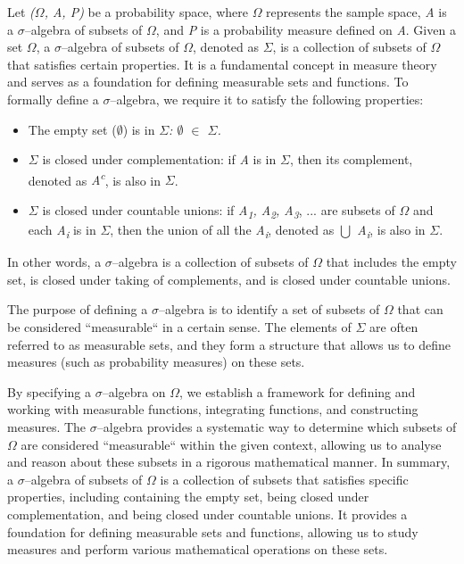 \documentclass[12pt,a4paper]{report}
\numberwithin{equation}{section}
\begin{document}
Let \emph{($\Omega$, A, P)} be a probability space, where \emph{$\Omega$} represents
the sample space, \emph{A} is a $\sigma$--algebra of subsets of \emph{$\Omega$}, and
\emph{P} is a probability measure defined on \emph{A}. Given a set
\emph{$\Omega$}, a $\sigma$--algebra of subsets of \emph{$\Omega$}, denoted as \emph{$\Sigma$}, is a
collection of subsets of \emph{$\Omega$} that satisfies certain properties. It
is a fundamental concept in measure theory and serves as a foundation
for defining measurable sets and functions. To formally define a
$\sigma$--algebra, we require it to satisfy the following properties:

\begin{itemize}
\item
  The empty set ($\emptyset$) is in \emph{$\Sigma$: $\emptyset$ $\in$ $\Sigma$.}
\item
  \emph{$\Sigma$} is closed under complementation: if \emph{A} is in \emph{$\Sigma$},
  then its complement, denoted as \emph{A\textsuperscript{c}}, is also
  in \emph{$\Sigma$}.
\item
  \emph{$\Sigma$} is closed under countable unions: if \emph{A\textsubscript{1}, A\textsubscript{2}, A\textsubscript{3}}, ...
  are subsets of \emph{$\Omega$} and each \emph{A\textsubscript{i}} is in \emph{$\Sigma$}, then the
  union of all the \emph{A\textsubscript{i}}, denoted as \emph{$\bigcup$ A\textsubscript{i}}, is also in
  \emph{$\Sigma$}.
\end{itemize}

In other words, a $\sigma$--algebra is a collection of subsets of \emph{$\Omega$} that
includes the empty set, is closed under taking of complements, and is
closed under countable unions.

The purpose of defining a $\sigma$--algebra is to identify a set of subsets of
\emph{$\Omega$} that can be considered ``measurable`` in a certain sense. The
elements of \emph{$\Sigma$} are often referred to as measurable sets, and they
form a structure that allows us to define measures (such as probability
measures) on these sets.

By specifying a $\sigma$--algebra on \emph{$\Omega$}, we establish a framework for
defining and working with measurable functions, integrating functions,
and constructing measures. The $\sigma$--algebra provides a systematic way to
determine which subsets of \emph{$\Omega$} are considered ``measurable`` within
the given context, allowing us to analyse and reason about these subsets
in a rigorous mathematical manner. In summary, a $\sigma$--algebra of subsets of
\emph{$\Omega$} is a collection of subsets that satisfies specific properties,
including containing the empty set, being closed under complementation,
and being closed under countable unions. It provides a foundation for
defining measurable sets and functions, allowing us to study measures
and perform various mathematical operations on these sets.
\end{document}
